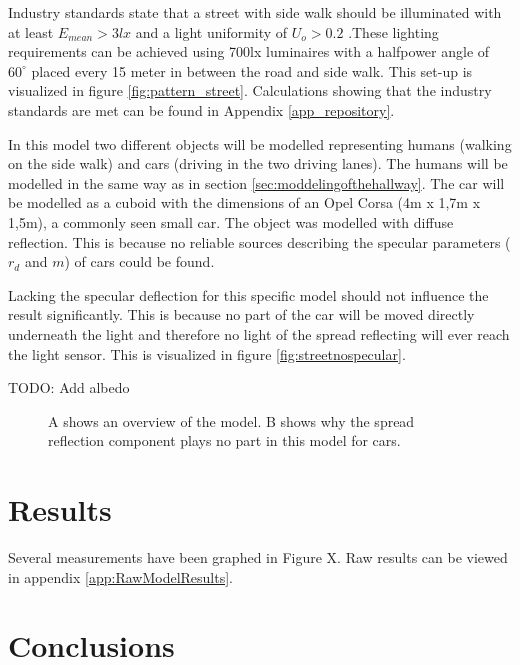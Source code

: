 Industry standards state that a street with side walk should be illuminated with at least $E_{mean} > 3lx$ and a light uniformity of $U_o > 0.2$ \cite{HandboekBestaandeBouw}.These lighting requirements can be achieved using 700lx luminaires with a halfpower angle of $60^{\circ}$ placed every 15 meter in between the road and side walk. This set-up is visualized in figure \ref{fig:pattern_street}. Calculations showing that the industry standards are met can be found in Appendix \ref{app_repository}.

In this model two different objects will be modelled representing humans (walking on the side walk) and cars (driving in the two driving lanes). The humans will be modelled in the same way as in section \ref{sec:moddelingofthehallway}. The car will be modelled as a cuboid with the dimensions of an Opel Corsa (4m x 1,7m x 1,5m), a commonly seen small car. The object was modelled with diffuse reflection. This is because no reliable sources describing the specular parameters ($r_d$ and $m$) of cars could be found.

Lacking the specular deflection for this specific model should not influence the result significantly. This is because no part of the car will be moved directly underneath the light and therefore no light of the spread reflecting will ever reach the light sensor. This is visualized in figure \ref{fig:streetnospecular}.

TODO: Add albedo

\begin{figure}
	\centering     %
	\caption{A shows an overview of the model. B shows why the spread reflection component plays no part in this model for cars.}
\end{figure}

\section{Results}
Several measurements have been graphed in Figure X. Raw results can be viewed in appendix \ref{app:RawModelResults}.

\section{Conclusions}


